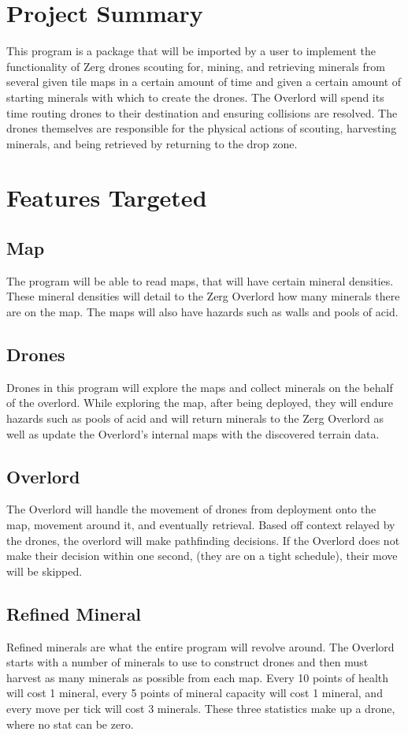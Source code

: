 \documentclass[12pt]{article}
\begin{document}
\section{Project Summary}
This program is a package that will be imported by a user to implement the functionality of Zerg drones scouting for, mining, and retrieving minerals from several given tile maps in a certain amount of time and given a certain amount of starting minerals with which to create the drones. The Overlord will spend its time routing drones to their destination and ensuring collisions are resolved. The drones themselves are responsible for the physical actions of scouting, harvesting minerals, and being retrieved by returning to the drop zone.
\section{Features Targeted}
\subsection{Map}
The program will be able to read maps, that will have certain mineral densities. These mineral densities will detail to the Zerg Overlord how many minerals there are on the map. The maps will also have hazards such as walls and pools of acid.
\subsection{Drones}
Drones in this program will explore the maps and collect minerals on the behalf of the overlord. While exploring the map, after being deployed, they will endure hazards such as pools of acid and will return minerals to the Zerg Overlord as well as update the Overlord's internal maps with the discovered terrain data.
\subsection{Overlord}
The Overlord will handle the movement of drones from deployment onto the map, movement around it, and eventually retrieval. Based off context relayed by the drones, the overlord will make pathfinding decisions. If the Overlord does not make their decision within one second, (they are on a tight schedule), their move will be skipped.
\newpage
\subsection{Refined Mineral}
Refined minerals are what the entire program will revolve around. The Overlord starts with a number of minerals to use to construct drones and then must harvest as many minerals as possible from each map. Every 10 points of health will cost 1 mineral, every 5 points of mineral capacity will cost 1 mineral, and every move per tick will cost 3 minerals. These three statistics make up a drone, where no stat can be zero.
\end{document}

